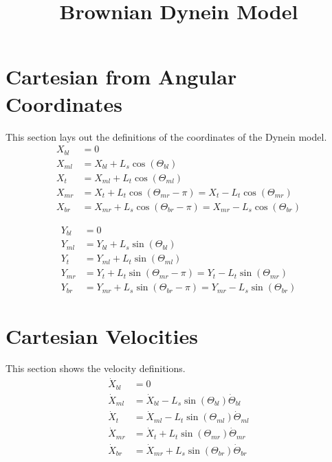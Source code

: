 \documentclass[11pt, landscape]{article}
\title{Brownian Dynein Model}
\begin{document}
\maketitle

\section{Cartesian from Angular Coordinates}
This section lays out the definitions of the coordinates of the Dynein model. \\
\begin{align}
  X_{bl} &= 0 \\
  X_{ml} &= X_{bl}+L_{s}\cos(\Theta_{bl}) \\
  X_{t}  &= X_{ml}+L_{t}\cos(\Theta_{ml}) \\
  X_{mr} &= X_{t} +L_{t}\cos(\Theta_{mr}-\pi) = X_{t} - L_{t}\cos(\Theta_{mr}) \\
  X_{br} &= X_{mr}+L_{s}\cos(\Theta_{br}-\pi) = X_{mr} - L_{s}\cos(\Theta_{br})
\end{align}

\begin{align}
  Y_{bl} &= 0 \\
  Y_{ml} &= Y_{bl}+L_{s}\sin(\Theta_{bl}) \\
  Y_{t}  &= Y_{ml}+L_{t}\sin(\Theta_{ml}) \\
  Y_{mr} &= Y_{t} +L_{t}\sin(\Theta_{mr}-\pi) = Y_{t} - L_{t}\sin(\Theta_{mr}) \\
  Y_{br} &= Y_{mr}+L_{s}\sin(\Theta_{br}-\pi) = Y_{mr} - L_{s}\sin(\Theta_{br})
\end{align}

\section{Cartesian Velocities}
This section shows the velocity definitions. \\
\begin{align}
  \dot{X}_{bl} &= 0 \\
  \dot{X}_{ml} &= \dot{X}_{bl} - L_{s}\sin(\Theta_{bl})\dot{\Theta}_{bl} \\
  \dot{X}_{t } &= \dot{X}_{ml} - L_{t}\sin(\Theta_{ml})\dot{\Theta}_{ml} \\
  \dot{X}_{mr} &= \dot{X}_{t } + L_{t}\sin(\Theta_{mr})\dot{\Theta}_{mr} \\
  \dot{X}_{br} &= \dot{X}_{mr} + L_{s}\sin(\Theta_{br})\dot{\Theta}_{br}
\end{align}  
             
\end{document}
